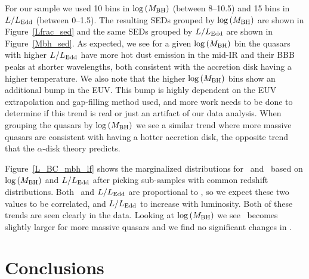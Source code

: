 For our sample we used 10 bins in $\log{(M_{\rm BH})}$ (between 8--10.5) and 15 bins in $L/L_{\rm Edd}$ (between 0--1.5).  The resulting SEDs grouped by $\log{(M_{\rm BH})}$ are shown in Figure~\ref{Lfrac_sed} and the same SEDs grouped by $L/L_{\rm Edd}$ are shown in Figure~\ref{Mbh_sed}. As expected, we see for a given $\log{(M_{\rm BH})}$ bin the quasars with higher $L/L_{\rm Edd}$ have more hot dust emission in the mid-IR and their BBB peaks at shorter wavelengths, both consistent with the accretion disk having a higher temperature.  We also note that the higher $\log{(M_{\rm BH})}$ bins show an additional bump in the EUV.  This bump is highly dependent on the EUV extrapolation and gap-filling method used, and more work needs to be done to determine if this trend is real or just an artifact of our data analysis.
When grouping the quasars by $\log{(M_{\rm BH})}$ we see a similar trend where more massive quasars are consistent with having a hotter accretion disk, the opposite trend that the $\alpha$-disk theory predicts.


Figure~\ref{L_BC_mbh_lf} shows the marginalized distributions for \ltwofive\ and \bctwofive\ based on $\log{(M_{\rm BH})}$ and $L/L_{\rm Edd}$ after picking sub-samples with common redshift distributions.  Both \bctwofive\ and $L/L_{\rm Edd}$ are proportional to \lbol, so we expect these two values to be correlated, and $L/L_{\rm Edd}$ to increase with luminosity.  Both of these trends are seen clearly in the data.  Looking at $\log{(M_{\rm BH})}$ we see \ltwofive\ becomes slightly larger for more massive quasars and we find no significant changes in \bctwofive.

\section{Conclusions} \label{BH_conclusions}

